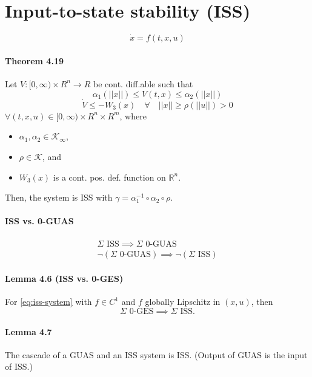\section{Input-to-state stability (ISS)}

\begin{equation}\label{eq:iss-system}
	\dot{x} = f(t,x,u)
\end{equation}

\paragraph{Theorem 4.19}
Let $V : [0,\infty) \times R^n \rightarrow R$ be cont. diff.able such that
\begin{equation}
	\alpha_1(||x||) \leq V(t,x) \leq \alpha_2(||x||)
\end{equation}
\begin{equation}
	\dot{V} \leq -W_3(x) \quad \forall \quad ||x|| \geq \rho(||u||) > 0
\end{equation}
$\forall (t,x,u) \in [0,\infty) \times R^n \times R^m$, where
\begin{itemize}
	\item $\alpha_1, \alpha_2 \in \mathcal{K}_\infty$,
	\item $\rho \in \mathcal{K}$, and
	\item $W_3(x)$ is a cont. pos. def. function on $\mathbb{R}^n$.
\end{itemize}
Then, the system is ISS with $\gamma=\alpha_1^{-1} \circ \alpha_2 \circ \rho$.

\paragraph{ISS vs. 0-GUAS}
\begin{gather}
	\Sigma \mbox{ ISS} \implies \Sigma \mbox{ 0-GUAS} \\
	\neg (\Sigma \mbox{ 0-GUAS}) \implies \neg (\Sigma \mbox{ ISS})
\end{gather}

\paragraph{Lemma 4.6 (ISS vs. 0-GES)}
For \eqref{eq:iss-system} with $f \in C^1$ and $f$ globally Lipschitz in $(x,u)$, then
\begin{equation}
	\Sigma \mbox{ 0-GES} \implies \Sigma \mbox{ ISS}
	.
\end{equation}

\paragraph{Lemma 4.7}
The cascade of a GUAS and an ISS system is ISS. (Output of GUAS is the input of ISS.)

